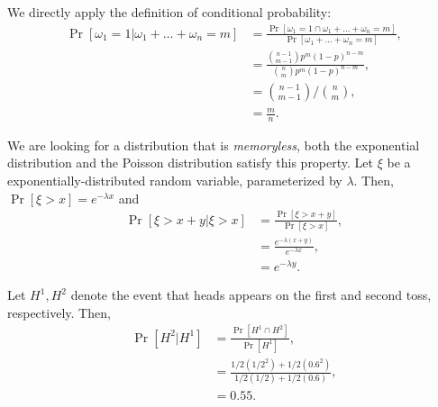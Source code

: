 \begin{problem}{1}
\end{problem}
\begin{solution}
We directly apply the definition of conditional probability:
\begin{align*}
    \Pr[\omega_1 = 1 | \omega_1 + \ldots + \omega_n = m] &= \frac{\Pr[\omega_1 = 1 \cap \omega_1 + \ldots + \omega_n = m]}{\Pr[\omega_1 + \ldots + \omega_n = m]}, \\
    &= \frac{\binom{n-1}{m-1}p^m(1-p)^{n-m}}{\binom{n}{m}p^m(1-p)^{n-m}}, \\
    &= \binom{n-1}{m-1} \big/ \binom{n}{m}, \\
    &= \frac{m}{n}.
\end{align*}
\end{solution}
\begin{problem}{2}
\end{problem}
\begin{solution}
    We are looking for a distribution that is \textit{memoryless}, both the exponential distribution and the Poisson distribution satisfy this property. Let $\xi$ be a exponentially-distributed random variable, parameterized by $\lambda$. Then, 
    $\Pr[\xi > x] = e^{-\lambda x}$ and 
    \begin{align*}
        \Pr[\xi > x+y | \xi > x] &= \frac{\Pr[\xi > x+y]}{\Pr[\xi > x]}, \\
        &= \frac{e^{-\lambda(x+y)}}{e^{-\lambda x}}, \\
        &= e^{-\lambda y}.
    \end{align*}
\end{solution}
\begin{problem}{3}
\end{problem}
\begin{solution}
    Let $H^1, H^2$ denote the event that heads appears on the first and second toss, respectively. Then,
    \begin{align*}
        \Pr[H^2|H^1] &= \frac{\Pr[H^1 \cap H^2]}{\Pr[H^1]}, \\
        &= \frac{1/2(1/2^2) + 1/2(0.6^2)}{1/2(1/2) + 1/2(0.6)}, \\
        &= 0.55.
    \end{align*}
\end{solution}
\begin{problem}{4}
\end{problem}
\begin{solution}
\end{solution}
\begin{problem}{5}
\end{problem}
\begin{solution}
    
\end{solution}
\begin{problem}{6}
\end{problem}
\begin{solution}
    
\end{solution}